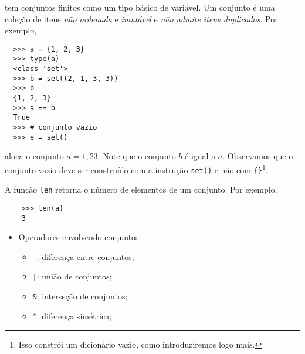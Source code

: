 \documentclass[12pt]{article}
\begin{document}
{\python} tem conjuntos finitos como um tipo básico de variável. Um conjunto é uma coleção de itens \emph{não ordenada} e \emph{imutável} e \emph{não admite itens duplicados}. Por exemplo,
\begin{lstlisting}
  >>> a = {1, 2, 3}
  >>> type(a)
  <class 'set'>
  >>> b = set((2, 1, 3, 3))
  >>> b
  {1, 2, 3}
  >>> a == b
  True
  >>> # conjunto vazio
  >>> e = set()
\end{lstlisting}
aloca o conjunto $a = {1,2 3}$. Note que o conjunto $b$ é igual a $a$. Observamos que o conjunto vazio deve ser construído com a instrução \verb+set()+ e não com \verb+{}+\footnote{Isso constrói um dicionário vazio, como introduziremos logo mais.}.

\begin{obs}
  A função {\python} \verb+len+ retorna o número de elementos de um conjunto. Por exemplo,
  \begin{lstlisting}
    >>> len(a)
    3
  \end{lstlisting}
\end{obs}

\begin{itemize}
\item Operadores envolvendo conjuntos:
  \begin{itemize}
  \item[] \verb+-+: diferença entre conjuntos;
  \item[] \verb+|+: união de conjuntos;
  \item[] \verb+&+: interseção de conjuntos;
  \item[] \verb+^+: diferença simétrica;
  \end{itemize}
\end{itemize}
\end{document}
